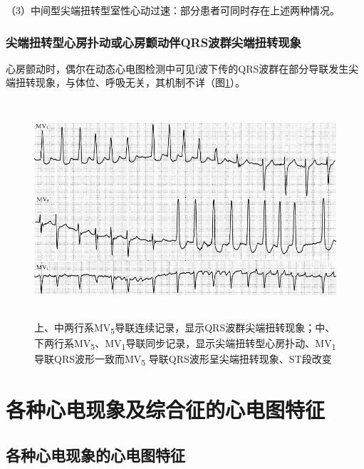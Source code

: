 （3）中间型尖端扭转型室性心动过速：部分患者可同时存在上述两种情况。

\protect\hypertarget{text00046.htmlux5cux23subid521}{}{}

\subsection{尖端扭转型心房扑动或心房颤动伴QRS波群尖端扭转现象}

心房颤动时，偶尔在动态心电图检测中可见f波下传的QRS波群在部分导联发生尖端扭转现象，与体位、呼吸无关，其机制不详（图\ref{fig39-12}）。

\begin{figure}[!htbp]
 \centering
 \includegraphics[width=5.58333in,height=3.17708in]{./images/Image00661.jpg}
 \captionsetup{justification=centering}
 \caption{上、中两行系MV\textsubscript{5}导联连续记录，显示QRS波群尖端扭转现象；中、下两行系MV\textsubscript{5}、MV\textsubscript{1}导联同步记录，显示尖端扭转型心房扑动、MV\textsubscript{1}导联QRS波形一致而MV\textsubscript{5} 导联QRS波形呈尖端扭转现象、ST段改变}
 \label{fig39-12}
  \end{figure} 


\protect\hypertarget{text00047.html}{}{}

\protect\hypertarget{text00047.htmlux5cux23chapter47}{}{}

\chapter{各种心电现象及综合征的心电图特征}

\protect\hypertarget{text00047.htmlux5cux23subid522}{}{}

\section{各种心电现象的心电图特征}

